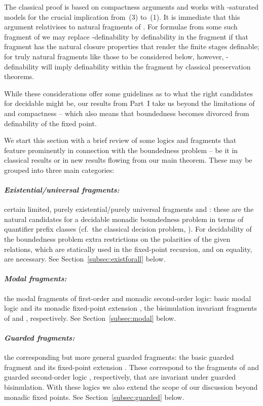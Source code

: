 \documentclass{LMCS}
\begin{document}
The classical proof is based on compactness arguments
and works with -saturated models for the crucial
implication from~(3) to~(1). It is immediate that this argument
relativises to natural fragments of .
For formulae  from some such fragment of  we
may replace -definability by definability in the
fragment if that fragment has the natural closure properties
that render the finite stages definable\?; for truly natural
fragments like those to be considered below, however,
-definability will imply definability within the
fragment by classical preservation theorems.

While these considerations offer some guidelines as to
what the right candidates  for
decidable  might be, our results from Part~I take
us beyond the limitations of  and compactness --
which also means that boundedness becomes divorced from
definability of the fixed point.

\medskip
We start this section with a brief review of some logics and fragments
that feature prominently in connection with the boundedness problem --
be it in classical results or in new results flowing from our main theorem.
These may be grouped into three main categories\?:

\paragraph{\textit{Existential/universal fragments:}}
certain limited, purely existential/purely universal fragments
 and \?: these are the 
natural candidates
for a decidable monadic boundedness problem  in terms of quantifier
prefix classes 
(cf.\ the classical decision problem, \cite{BGG}).
For decidability of the boundedness problem
extra restrictions on the polarities of
the given relations,
which are statically used in the fixed-point recursion,
and on equality, are necessary.
See Section~\ref{subsec:existforall} below.

\paragraph*{\textit{Modal fragments:}}
the modal fragments of first-order and monadic second-order logic\?:
basic modal logic  and its monadic fixed-point extension
, the bisimulation invariant
fragments of  and , respectively.
See Section~\ref{subsec:modal} below.

\paragraph*{\textit{Guarded fragments:}} the corresponding but more general guarded fragments\?:
the basic guarded fragment  and its fixed-point extension
. These correspond to the fragments of
 and guarded second-order logic , respectively,
that are invariant under guarded bisimulation.
With these logics we also
extend the scope of our discussion beyond monadic fixed points.
See Section~\ref{subsec:guarded} below.
\end{document}
